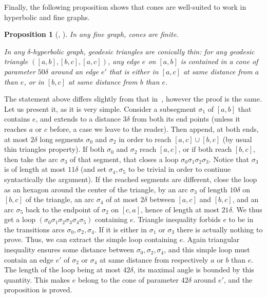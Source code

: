 \documentclass[11pt]{article}
\newtheorem{prop}[theo]{Proposition}
\theoremstyle{definition}
\numberwithin{equation}{section}
\begin{document}
Finally, the following proposition shows that cones are well-suited to work in hyperbolic and fine graphs.

\begin{prop}[{\cite{Dthesis}, \cite[\S2.3]{DYaman}}] \label{prop;cones_are_nicer}
In any fine graph, cones are finite.

In any $\delta$-hyperbolic graph, geodesic triangles are conically thin: for any geodesic triangle $([a,b], [b,c], [a,c])$, any edge $e$ on $[a,b]$ is contained in a cone of parameter $50\delta$ around an edge $e'$ that is either in $[a,c]$ at same distance from $a$ than $e$, or in $[b,c]$ at same distance from $b$ than $e$.
\end{prop}

The statement above differs slightly from that in~\cite[\S2.3] {DYaman}, however the proof is the same. Let us present it, as it is very simple. Consider a subsegment $\sigma_1$ of $[a,b]$ that contains $e$, and extends to a distance $3\delta$ from both its end points (unless it reaches $a$ or $c$ before, a case we leave to the reader). Then append, at both ends, at most $2\delta$ long segments $\sigma_0$ and $\sigma_2$ in order to reach $[a,c] \cup [b,c]$ (by usual thin triangles property). If both $\sigma_0$ and $\sigma_2$ reach $[a,c]$, or if both reach $ [b,c]$, then take the arc $\sigma_3$ of that segment, that closes a loop $\sigma_0\sigma_1\sigma_2\sigma_3$. Notice that $\sigma_3$ is of length at most $11\delta$ (and set $\sigma_4, \sigma_5$ to be trivial in order to continue syntactically the argument). If the reached segments are different, close the loop as an hexagon around the center of the triangle, by an arc $\sigma_3$ of length $10\delta$ on $[b,c]$ of the triangle, an arc $\sigma_4$ of at most $2\delta$ between $[a,c]$ and $ [b,c]$, and an arc $\sigma_5$ back to the endpoint of $\sigma_2$ on $[c,a]$, hence of length at most $21\delta$. We thus get a loop $(\sigma_0\sigma_1\sigma_2\sigma_3\sigma_4\sigma_5)$ containing $e$. Triangle inequality forbids $e$ to be in the transitions arcs $\sigma_0, \sigma_2, \sigma_4$. If it is either in $\sigma_1$ or $\sigma_3$ there is actually nothing to prove. Thus, we can extract the simple loop containing $e$. Again triangular inequality ensures some distance between $\sigma_0, \sigma_2, \sigma_4$, and this simple loop must contain an edge $e'$ of $\sigma_2$ or $\sigma_4$ at same distance from respectively $a$ or $b$ than $e$. The length of the loop being at most $42\delta$, its maximal angle is bounded by this quantity. This makes $e$ belong to the cone of parameter $42\delta$ around $e'$, and the proposition is proved.
\end{document}
